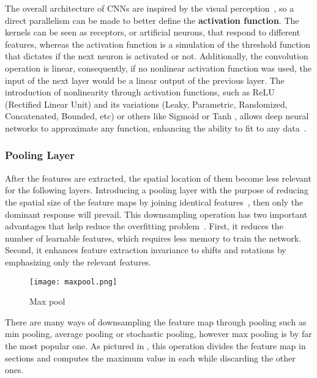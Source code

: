 \documentclass[class=report, crop=false, a4paper, 12pt]{standalone}
\begin{document}
\par The overall architecture of CNNs are inspired by the visual perception~\autocite{hubelReceptiveFieldsBinocular1962}, so a direct parallelism can be made to better define the \textbf{activation function}. The kernels can be seen as receptors, or artificial neurons, that respond to different features, whereas the activation function is a simulation of the threshold function that dictates if the next neuron is activated or not. Additionally, the convolution operation is linear, consequently, if no nonlinear activation function was used, the input of the next layer would be a linear output of the previous layer. The introduction of nonlinearity through activation functions, such as ReLU (Rectified Linear Unit) and its variations (Leaky, Parametric, Randomized, Concatenated, Bounded, etc) or others like Sigmoid or Tanh \autocite{dubeyActivationFunctionsDeep2022}, allows deep neural networks to approximate any function, enhancing the ability to fit to any data~\autocite{liSurveyConvolutionalNeural2022}.

\subsubsection{Pooling Layer}
After the features are extracted, the spatial location of them become less relevant for the following layers. Introducing a pooling layer with the purpose of reducing the spatial size of the feature maps by joining identical features~\autocite{lecunDeepLearning2015, guRecentAdvancesConvolutional2018}, then only the dominant response will prevail. This downsampling operation has two important advantages that help reduce the overfitting problem~\autocite{ajitReviewConvolutionalNeural2020,liSurveyConvolutionalNeural2022}. First, it reduces the number of learnable features, which requires less memory to train the network. Second, it enhances feature extraction invariance to shifts and rotations by emphasizing only the relevant features.

\begin{figure}[!h]
    \centering
    \texttt{[image: maxpool.png]} %
    \caption{Max pool}
    \label{fig:maxpool}
\end{figure}

There are many ways of downsampling the feature map through pooling such as min pooling, average pooling or stochastic pooling, however max pooling is by far the most popular one. As pictured in , this operation divides the feature map in sections and computes the maximum value in each while discarding the other ones.
\end{document}
